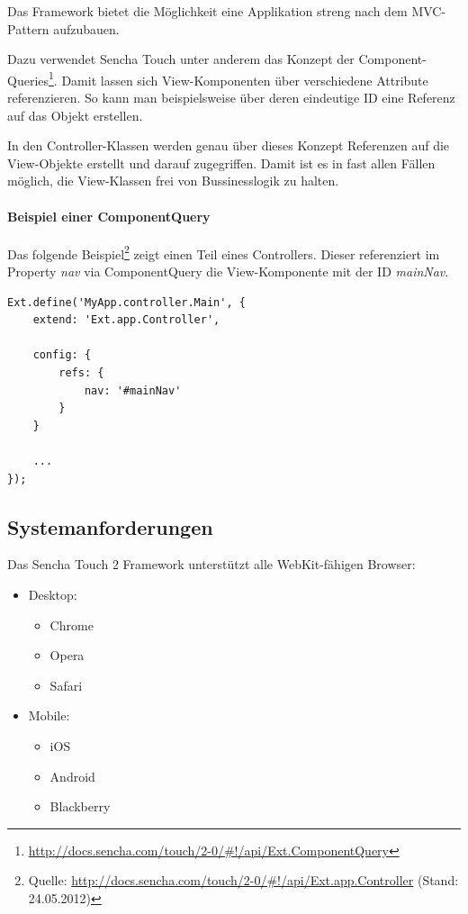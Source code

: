 Das Framework bietet die Möglichkeit eine Applikation streng nach dem MVC-Pattern aufzubauen.

Dazu verwendet Sencha Touch unter anderem das Konzept der Component-Queries\footnote{\url{http://docs.sencha.com/touch/2-0/\#!/api/Ext.ComponentQuery}}. Damit lassen sich View-Komponenten über verschiedene Attribute referenzieren. So kann man beispielsweise über deren eindeutige ID eine Referenz auf das Objekt erstellen.

In den Controller-Klassen werden genau über dieses Konzept Referenzen auf die View-Objekte erstellt und darauf zugegriffen. Damit ist es in fast allen Fällen möglich, die View-Klassen frei von Bussinesslogik zu halten.

\paragraph{Beispiel einer ComponentQuery}
Das folgende Beispiel\footnote{Quelle: \url{http://docs.sencha.com/touch/2-0/\#!/api/Ext.app.Controller} (Stand: 24.05.2012)} zeigt einen Teil eines Controllers. Dieser referenziert im Property \emph{nav} via ComponentQuery die View-Komponente mit der ID \emph{mainNav}.

\lstset{language=JavaScript}
\begin{lstlisting}
Ext.define('MyApp.controller.Main', {
	extend: 'Ext.app.Controller',
	
	config: {
		refs: {
			nav: '#mainNav'
		}
	}
	
	...
});
\end{lstlisting}

\subsection{Systemanforderungen}
Das Sencha Touch 2 Framework unterstützt alle WebKit-fähigen Browser:

\begin{itemize}
\item Desktop:
\begin{itemize}
	\item Chrome
	\item Opera
	\item Safari
\end{itemize}

\item Mobile:
\begin{itemize}
	\item iOS
	\item Android
	\item Blackberry
\end{itemize}
\end{itemize}

